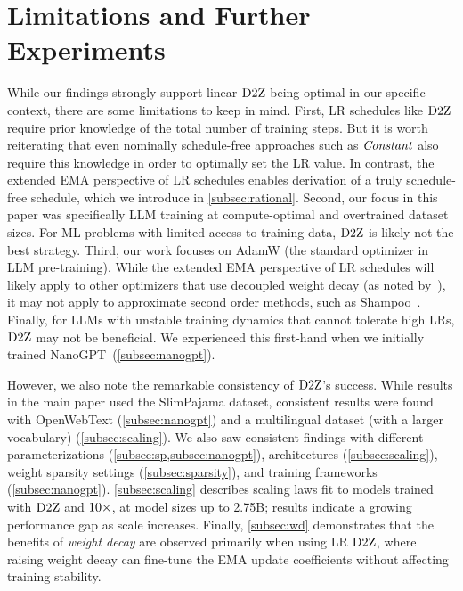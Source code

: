 \section{Limitations and Further Experiments}

While our findings strongly support linear $\mbox{D2Z}$ being optimal in
our specific context, there are some limitations to keep in mind.
%
First, LR schedules like $\mbox{D2Z}$ require prior knowledge of the total
number of training steps.  But it is worth reiterating that even
nominally schedule-free approaches such as $\mbox{\emph{Constant}}$ also require
this knowledge in order to optimally set the LR value.  In contrast,
the extended EMA perspective of LR schedules enables derivation of a
truly schedule-free schedule, which we introduce
in \cref{subsec:rational}.
%
Second, our focus in this paper was specifically LLM training at
compute-optimal and overtrained dataset sizes.  For ML problems with
limited access to training data, $\mbox{D2Z}$ is likely not the best
strategy.
%
Third, our work focuses on AdamW (the standard optimizer in LLM
pre-training).
%
While the extended EMA perspective of LR schedules will likely apply
to other optimizers that use decoupled weight decay (as noted
by~\citet{wang2024how}), it may not apply to approximate second order
methods, such as Shampoo~\citep{gupta2018shampoo}.
%
Finally, for LLMs with unstable training dynamics that cannot tolerate
high LRs, $\mbox{D2Z}$ may not be beneficial.  We experienced this
first-hand when we initially trained NanoGPT~(\cref{subsec:nanogpt}).

However, we also note the remarkable consistency of $\mbox{D2Z}$'s success.
%
While results in the main paper used the SlimPajama dataset,
consistent results were found with OpenWebText (\cref{subsec:nanogpt})
and a multilingual dataset (with a larger vocabulary)
(\cref{subsec:scaling}).
We also saw consistent findings with different parameterizations
(\cref{subsec:sp,subsec:nanogpt}), architectures
(\cref{subsec:scaling}), weight sparsity settings
(\cref{subsec:sparsity}), and training frameworks
(\cref{subsec:nanogpt}).
%
\cref{subsec:scaling} describes scaling laws fit to models trained
%
with $\mbox{D2Z}$ and $\mbox{10}\times$, at model sizes up to 2.75B; results indicate
a growing performance gap as scale increases.
%
Finally, \cref{subsec:wd} demonstrates that the benefits
of \emph{weight decay} are observed primarily when using LR $\mbox{D2Z}$,
where raising weight decay can fine-tune the EMA update coefficients
without affecting training stability.
%
%

